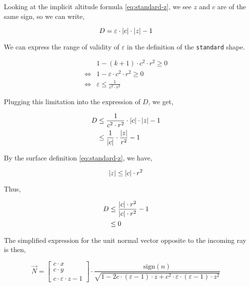 Looking at the implicit altitude formula \cref{eq:standard-z}, we see
$z$ and $c$ are of the same sign, so we can write,

\begin{equation}
D = \varepsilon \cdot \abs{c} \cdot \abs{z} - 1
\end{equation}

We can express the range of validity of $\varepsilon$ in the definition
of the \lstinline{standard} shape.

\begin{equation} \begin{split}
& 1 - (k+1) \cdot c^2 \cdot r^2 \geq 0 \\
\iff & 1 - \varepsilon \cdot c^2 \cdot r^2 \geq 0 \\
\iff & \varepsilon \leq \frac{1}{c^2 \cdot r^2}
\end{split} \end{equation}

Plugging this limitation into the expression of $D$, we get,

\begin{equation} \begin{split}
D &\leq \frac{1}{c^2 \cdot r^2} \cdot \abs{c} \cdot \abs{z} - 1 \\
  &\leq \frac{1}{\abs{c}} \cdot \frac{\abs{z}}{r^2} - 1
\end{split} \end{equation}

By the surface definition \cref{eq:standard-z}, we have,

\begin{equation}
\abs{z} \leq \abs{c} \cdot r^2
\end{equation}

Thus,

\begin{equation} \begin{split}
D &\leq \frac{\abs{c} \cdot r^2}{\abs{c} \cdot r^2} -1 \\
  &\leq 0
\end{split} \end{equation}

The simplified expression for the unit normal vector opposite to the incoming
ray is then,

\begin{equation}
\overrightarrow{N} =
\begin{bmatrix}
c \cdot x \\ c \cdot y \\ c \cdot \varepsilon \cdot z - 1
\end{bmatrix} \cdot
\frac{\textrm{sign}(n)}{
\sqrt{1 - 2 c \cdot (\varepsilon - 1) \cdot z + c^2 \cdot \varepsilon \cdot
         (\varepsilon - 1) \cdot z^2}}
\end{equation}

